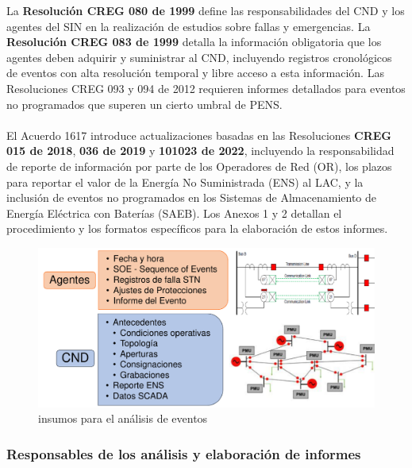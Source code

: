 \documentclass[a5paper]{book}%
\begin{document}
La \textbf{Resolución CREG 080 de 1999} define las responsabilidades del CND y los agentes del SIN en la realización de estudios sobre fallas y emergencias. La \textbf{Resolución CREG 083 de 1999} detalla la información obligatoria que los agentes deben adquirir y suministrar al CND, incluyendo registros cronológicos de eventos con alta resolución temporal y libre acceso a esta información. Las Resoluciones CREG 093 y 094 de 2012 requieren informes detallados para eventos no programados que superen un cierto umbral de PENS.\\\\

El Acuerdo 1617 introduce actualizaciones basadas en las Resoluciones \textbf{CREG 015 de 2018}, \textbf{036 de 2019} y \textbf{101023 de 2022}, incluyendo la responsabilidad de reporte de información por parte de los Operadores de Red (OR), los plazos para reportar el valor de la Energía No Suministrada (ENS) al LAC, y la inclusión de eventos no programados en los Sistemas de Almacenamiento de Energía Eléctrica con Baterías (SAEB). Los Anexos 1 y 2 detallan el procedimiento y los formatos específicos para la elaboración de estos informes.

\begin{figure}[H]
  \centering
  
  \caption{insumos para el análisis de eventos}
  \label{fig:insumoseventos}
  \includegraphics[width=0.8\linewidth]{insumos_eventos}
\end{figure}

\subsubsection{Responsables de los análisis y elaboración de informes}
\end{document}
